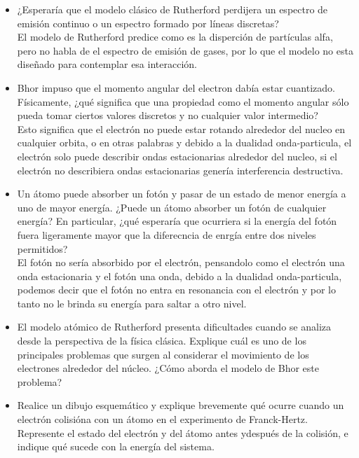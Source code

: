 \documentclass[12pt,a4paper]{article}
\begin{document}
\begin{itemize}

\item ¿Esperaría que el modelo clásico de Rutherford perdijera un espectro de emisión continuo o un espectro formado por líneas discretas?\\

El modelo de Rutherford predice como es la disperción de partículas alfa, pero no habla de el espectro de emisión de gases, por lo que el modelo no esta diseñado para contemplar esa interacción. 

\item Bhor impuso que el momento angular del electron dabía estar cuantizado. Físicamente, ¿qué significa que una propiedad como el momento angular sólo pueda tomar ciertos valores discretos y no cualquier valor intermedio?\\

Esto significa que el electrón no puede estar rotando alrededor del nucleo en cualquier orbita, o en otras palabras y debido a la dualidad onda-particula, el electrón solo puede describir ondas estacionarias alrededor del nucleo, si el electrón no describiera ondas estacionarias genería interferencia destructiva. 

\item Un átomo puede absorber un fotón y pasar de un estado de menor energía a uno de mayor energía. ¿Puede un átomo absorber un fotón de cualquier energía? En particular, ¿qué esperaría que ocurriera si la energía del fotón fuera ligeramente mayor que la diferecncia de enrgía entre dos niveles permitidos? \\

El fotón no sería absorbido por el electrón, pensandolo como el electrón una onda estacionaria y el fotón una onda, debido a la dualidad onda-particula, podemos decir que el fotón no entra en resonancia con el electrón y por lo tanto no le brinda su energía para saltar a otro nivel.

\item El modelo atómico de Rutherford presenta dificultades cuando se analiza desde la perspectiva de la física clásica. Explique cuál es uno de los principales problemas que surgen al considerar el movimiento de los electrones alrededor del núcleo. ¿Cómo aborda el modelo de Bhor este problema? \\

\item Realice un dibujo esquemático y explique brevemente qué ocurre cuando un electrón colisióna con un átomo en el experimento de Franck-Hertz. Represente el estado del electrón y del átomo antes ydespués de la colisión, e indique qué sucede con la energía del sistema.

\end{itemize}
\end{document}
